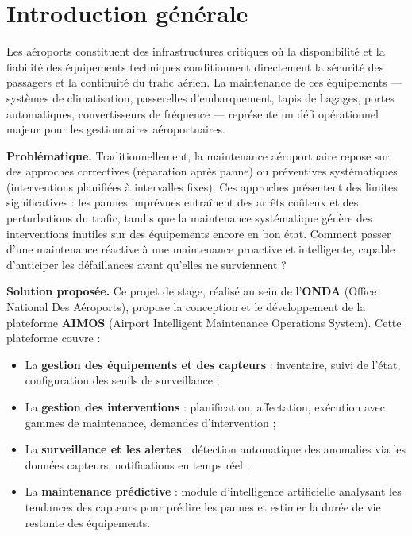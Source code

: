 \chapter*{Introduction générale}

Les aéroports constituent des infrastructures critiques où la disponibilité et la fiabilité des équipements techniques conditionnent directement la sécurité des passagers et la continuité du trafic aérien. La maintenance de ces équipements — systèmes de climatisation, passerelles d'embarquement, tapis de bagages, portes automatiques, convertisseurs de fréquence — représente un défi opérationnel majeur pour les gestionnaires aéroportuaires.

\vspace{0.3cm}
\noindent\textbf{Problématique.} Traditionnellement, la maintenance aéroportuaire repose sur des approches correctives (réparation après panne) ou préventives systématiques (interventions planifiées à intervalles fixes). Ces approches présentent des limites significatives : les pannes imprévues entraînent des arrêts coûteux et des perturbations du trafic, tandis que la maintenance systématique génère des interventions inutiles sur des équipements encore en bon état. Comment passer d'une maintenance réactive à une maintenance proactive et intelligente, capable d'anticiper les défaillances avant qu'elles ne surviennent ?

\vspace{0.3cm}
\noindent\textbf{Solution proposée.} Ce projet de stage, réalisé au sein de l'\textbf{ONDA} (Office National Des Aéroports), propose la conception et le développement de la plateforme \textbf{AIMOS} (Airport Intelligent Maintenance Operations System). Cette plateforme couvre :
\begin{itemize}
    \item La \textbf{gestion des équipements et des capteurs} : inventaire, suivi de l'état, configuration des seuils de surveillance ;
    \item La \textbf{gestion des interventions} : planification, affectation, exécution avec gammes de maintenance, demandes d'intervention ;
    \item La \textbf{surveillance et les alertes} : détection automatique des anomalies via les données capteurs, notifications en temps réel ;
    \item La \textbf{maintenance prédictive} : module d'intelligence artificielle analysant les tendances des capteurs pour prédire les pannes et estimer la durée de vie restante des équipements.
\end{itemize}

